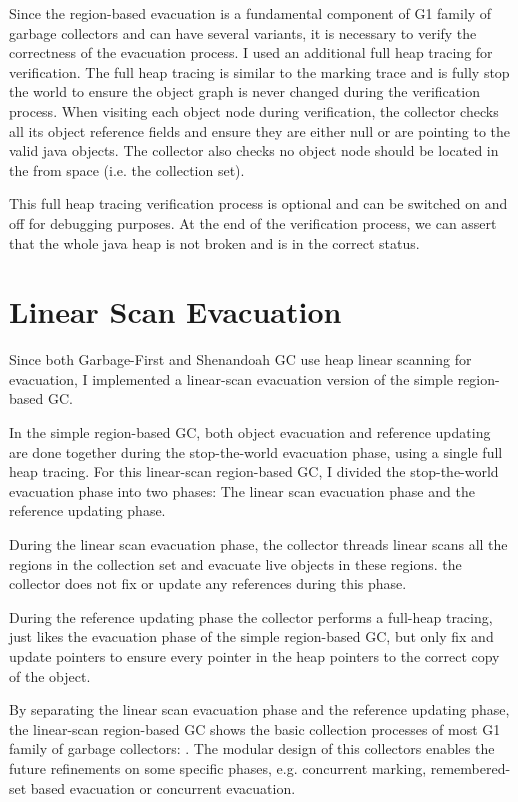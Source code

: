 Since the region-based evacuation is a fundamental component of G1 family of garbage collectors
and can have several variants, it is necessary to verify the correctness of the evacuation process.
I used an additional full heap tracing for verification. The full heap tracing is
similar to the marking trace and is fully stop the world to ensure the object graph is never changed
during the verification process.
When visiting each object node during verification, the collector checks all its object reference fields
and ensure they are either null or are pointing to the valid java objects.
The collector also checks no object node should be located in the from space (i.e. the collection set).

This full heap tracing verification process is optional and can be switched on and off for
debugging purposes.
At the end of the verification process, we can assert that the whole java heap is
not broken and is in the correct status.

\section{Linear Scan Evacuation}
\label{sec:linearscangc}

Since both Garbage-First and Shenandoah GC use heap linear scanning for evacuation,
I implemented a linear-scan evacuation version of the simple region-based GC.

In the simple region-based GC, both object evacuation and reference updating are
done together during the stop-the-world evacuation phase, using a single full heap tracing.
For this linear-scan region-based GC, I divided the stop-the-world evacuation phase into
two phases: The linear scan evacuation phase and the reference updating phase.

During the linear scan evacuation phase, the collector threads linear scans all the regions
in the collection set and evacuate live objects in these regions. the collector does not
fix or update any references during this phase.

During the reference updating phase the collector performs a full-heap tracing,
just likes the evacuation phase of the simple region-based GC, but only fix and update
pointers to ensure every pointer in the heap pointers to the correct copy of the object.

By separating the linear scan evacuation phase and the reference updating phase,
the linear-scan region-based GC shows the basic collection processes of most G1 family
of garbage collectors: .
The modular design of this collectors enables the future refinements on some specific
phases, e.g. concurrent marking, remembered-set based evacuation or concurrent evacuation.

